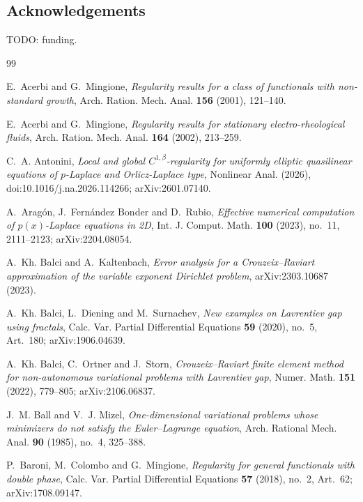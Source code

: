 \documentclass[11pt]{amsart}
\theoremstyle{definition}
\theoremstyle{remark}
\numberwithin{equation}{section}
\begin{document}
\subsection*{Acknowledgements}
TODO: funding.

\begin{thebibliography}{99}

E.~Acerbi and G.~Mingione, \emph{Regularity results for a class of functionals with non-standard growth}, Arch. Ration. Mech. Anal. \textbf{156} (2001), 121--140.

E.~Acerbi and G.~Mingione, \emph{Regularity results for stationary electro-rheological fluids}, Arch. Ration. Mech. Anal. \textbf{164} (2002), 213--259.

C.~A. Antonini, \emph{Local and global $C^{1,\beta}$-regularity for uniformly elliptic quasilinear equations of $p$-Laplace and Orlicz-Laplace type}, Nonlinear Anal. (2026), doi:10.1016/j.na.2026.114266; arXiv:2601.07140.

A.~Arag\'on, J.~Fern\'andez Bonder and D.~Rubio, \emph{Effective numerical computation of $p(x)$-Laplace equations in 2D}, Int. J. Comput. Math. \textbf{100} (2023), no.~11, 2111--2123; arXiv:2204.08054.

A.~Kh. Balci and A.~Kaltenbach, \emph{Error analysis for a Crouzeix--Raviart approximation of the variable exponent Dirichlet problem}, arXiv:2303.10687 (2023).

A.~Kh. Balci, L.~Diening and M.~Surnachev, \emph{New examples on Lavrentiev gap using fractals}, Calc. Var. Partial Differential Equations \textbf{59} (2020), no.~5, Art.~180; arXiv:1906.04639.

A.~Kh. Balci, C.~Ortner and J.~Storn, \emph{Crouzeix--Raviart finite element method for non-autonomous variational problems with Lavrentiev gap}, Numer. Math. \textbf{151} (2022), 779--805; arXiv:2106.06837.

J.~M. Ball and V.~J. Mizel, \emph{One-dimensional variational problems whose minimizers do not satisfy the Euler--Lagrange equation}, Arch. Rational Mech. Anal. \textbf{90} (1985), no.~4, 325--388.

P.~Baroni, M.~Colombo and G.~Mingione, \emph{Regularity for general functionals with double phase}, Calc. Var. Partial Differential Equations \textbf{57} (2018), no.~2, Art.~62; arXiv:1708.09147.


\end{thebibliography}
\end{document}
